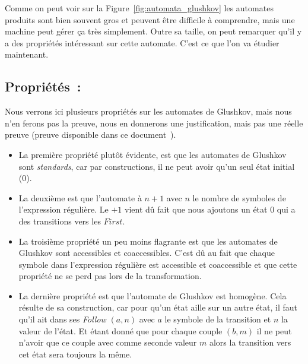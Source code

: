 \vphantom{}

Comme on peut voir sur la Figure~\ref{fig:automata_glushkov} les automates
produits sont bien souvent gros et peuvent être difficile à comprendre, mais
une machine peut gérer ça très simplement. Outre sa taille, on peut remarquer
qu'il y a des propriétés intéressant sur cette automate. C'est ce que l'on va
étudier maintenant.

\subsection{Propriétés~:}

Nous verrons ici plusieurs propriétés sur les automates de Glushkov, mais nous
n'en ferons pas la preuve, nous en donnerons une justification, mais pas une
réelle preuve (preuve disponible dans ce
document~\cite{DBLP:journals/tcs/CaronZ00}).

\vphantom{}

\begin{itemize}[label=\textbullet]
    \item La première propriété plut\^{o}t évidente, est que les automates de Glushkov
          sont \textit{standards}, car par constructions, il ne peut avoir qu'un seul
          état initial (0).

          \vphantom{}

    \item La deuxième est que l'automate à \(n + 1\) avec \(n\) le nombre de symboles de
          l'expression régulière. Le \(+ 1\) vient dû fait que nous ajoutons un état
          \(0\) qui a des transitions vers les \(First\).

          \vphantom{}

    \item La troisième propriété un peu moins flagrante est que les automates de Glushkov
          sont accessibles et coaccessibles. C'est dû au fait que chaque symbole dans
          l'expression régulière est accessible et coaccessible et que cette propriété ne
          se perd pas lors de la transformation.

          \vphantom{}

    \item La dernière propriété est que l'automate de Glushkov est homogène. Cela résulte
          de sa construction, car pour qu'un état aille sur un autre état, il faut qu'il
          ait dans ses \textit{Follow} \((a, n)\) avec \(a\) le symbole de la transition
          et \(n\) la valeur de l'état. Et étant donné que pour chaque couple \((b, m)\)
          il ne peut n'avoir que ce couple avec comme seconde valeur \(m\) alors la
          transition vers cet état sera toujours la même.
\end{itemize}


